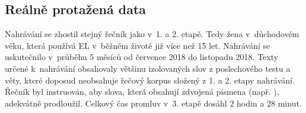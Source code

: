 \subsection{Reálně protažená data}
\label{chap:realisation:augmentation:real}


Nahrávání se zhostil stejný řečník jako v~1. a 2. etapě.
Tedy žena v~důchodovém věku, která používá EL v~běžném životě již více než 15 let.
Nahrávání se uskutečnilo v~průběhu 5 měsíců od července 2018 do listopadu 2018.
Texty určené k~nahrávání obsahovaly většinu izolovaných slov z poslechového testu a věty, které doposud neobsahuje řečový korpus složený z 1. a 2. etapy nahrávání.
Řečník byl instruován, aby slova, která obsahují zdvojená písmena (např. ), adekvátně prodloužil.
Celkový čas promluv v~3. etapě dosáhl $2$ hodin a $28$ minut.


